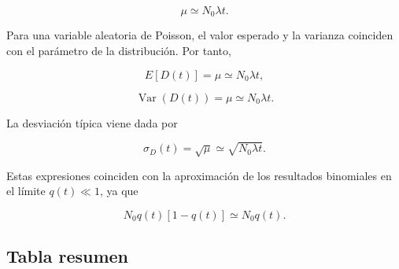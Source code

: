 \documentclass[12pt,a4paper]{article}
\begin{document}
\begin{equation}
    \mu\simeq N_0\lambda t.
\end{equation}

Para una variable aleatoria de Poisson, el valor esperado y la varianza coinciden con el parámetro de la distribución. Por tanto,

\begin{equation}
    E[D(t)]=\mu\simeq N_0\lambda t,
    \label{eq:media_poisson_desintegrados}
\end{equation}

\begin{equation}
    \operatorname{Var}(D(t))=\mu\simeq N_0\lambda t.
    \label{eq:varianza_poisson_desintegrados}
\end{equation}

La desviación típica viene dada por

\begin{equation}
    \sigma_D(t)=\sqrt{\mu}\simeq \sqrt{N_0\lambda t}.
    \label{eq:desviacion_poisson_desintegrados}
\end{equation}

Estas expresiones coinciden con la aproximación de los resultados binomiales en el límite $q(t)\ll 1$, ya que

\begin{equation}
    N_0q(t)\left[1-q(t)\right]\simeq N_0q(t).
\end{equation}

\subsection{Tabla resumen}
\end{document}
